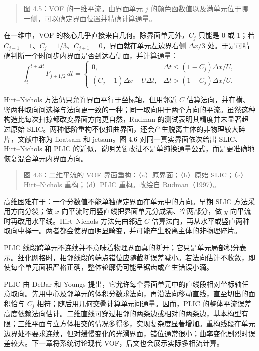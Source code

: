 \documentclass[11pt,a4paper,openany,fontset=none]{ctexbook}
\begin{document}
\begin{quote}\small 图 4.5：VOF 的一维平流。由界面单元 $j$ 的颜色函数值以及满单元位于哪一侧，可以确定界面位置并精确计算通量。\end{quote}
在一维中，VOF 的核心几乎直接来自几何。除界面单元外，$C_j$ 只能是 0 或 1；若 $C_{j-1}=1$、$C_j=1/3$、$C_{j+1}=0$，界面就在单元左边界右侧 $\Delta x/3$ 处。于是可精确判断一个时间步内界面是否到达右侧面，并计算通量：
\begin{equation}
\int_{t}^{t+\Delta t}F_{j+1/2}\,dt=
\begin{cases}
0,&\Delta t\leq (1-C_j)\Delta x/U,\\
(C_j-1)\Delta x+U\Delta t,&\Delta t>(1-C_j)\Delta x/U.
\end{cases}
\tag{4.11}
\end{equation}

Hirt--Nichols 方法仍只允许界面平行于坐标轴，但用邻近 $C$ 估算法向，并在横、竖两种取向间选择与法向更一致的一种；同一取向用于两个方向的平流。虽然这种构造比每次扫掠都改变界面方向更自然，Rudman 的测试表明其精度并未显著超过原始 SLIC。两种低阶重构不仅扭曲界面，还会产生脱离主体的非物理较大碎片，文献中称为 floatsam 和 jetsam。图 4.6 对同一真实界面依次给出 SLIC、Hirt--Nichols 和 PLIC 的近似，说明关键改进不是单纯换通量公式，而是更准确地恢复混合单元内界面方向。

\begin{quote}\small 图 4.6：二维平流的 VOF 界面重构：（a）原界面；（b）原始 SLIC；（c）Hirt--Nichols 重构；（d）PLIC 重构。改绘自 Rudman（1997）。\end{quote}
高维困难在于：一个分数值不能单独确定界面在单元中的方向。早期 SLIC 方法采用方向分裂；做 $x$ 向平流时用竖直线把界面单元分成满、空两部分，做 $y$ 向平流时再改用水平线。Hirt--Nichols 方法先由邻近 $C$ 估算法向，再从水平或竖直两种取向中择一。两者都会使界面明显畸变，并可能产生脱离主体的非物理碎片。

PLIC 线段跨单元不连续并不意味着物理界面真的断开；它只是单元局部积分表示。细化网格时，相邻线段的端点错位应随截断误差减小。若法向估计不收敛，即使每个单元面积严格正确，整体轮廓仍可能呈锯齿或产生错误小滴。

PLIC 由 DeBar 和 Youngs 提出，它允许每个界面单元中的直线段相对坐标轴任意取向。先用中心及邻单元的体积分数求法向，再沿法向移动直线，直至切出的面积恰与 $C_j$ 相符；随后用几何交叠计算单元间通量。因而，PLIC 的整体平流误差高度依赖法向估计。二维直线可穿过相邻的两条边或相对的两条边，基本构型有限；三维平面与立方体相交的情况多得多，实现复杂度显著增加。重构线段在单元边界处不要求连续，但对缓慢变化的光滑界面，错位通常很小；曲率变化剧烈时误差较大。下一章将系统讨论现代 VOF，后文也会展示实际多相流计算。
\end{document}
